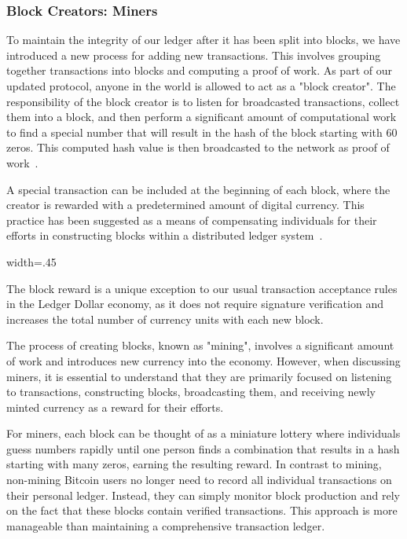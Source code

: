 \subsubsection{Block Creators: Miners}
To maintain the integrity of our ledger after it has been split into blocks, we have introduced a new process for adding
new transactions. This involves grouping together transactions into blocks and computing a proof of work. As part of our
updated protocol, anyone in the world is allowed to act as a "block creator". The responsibility of the block creator is
to listen for broadcasted transactions, collect them into a block, and then perform a significant amount of computational
work to find a special number that will result in the hash of the block starting with 60 zeros. This computed hash value
is then broadcasted to the network as proof of work~\cite{wood2014ethereum}.

A special transaction can be included at the beginning of each block, where the creator is rewarded with a predetermined
amount of digital currency. This practice has been suggested as a means of compensating individuals for their efforts in
constructing blocks within a distributed ledger system~\cite{ding2020incentive}.

{width=.45\textwidth}%

The block reward is a unique exception to our usual transaction acceptance rules in the Ledger Dollar economy, as it does
not require signature verification and increases the total number of currency units with each new block.

The process of creating blocks, known as
"mining", involves a significant amount of work and introduces new currency into the economy. However, when discussing
miners, it is essential to understand that they are primarily focused on listening to transactions, constructing blocks,
broadcasting them, and receiving newly minted currency as a reward for their efforts.

For miners, each block can be thought of as a miniature lottery where individuals guess numbers rapidly until one person
finds a combination that results in a hash starting with many zeros, earning the resulting reward. In contrast to mining,
non-mining Bitcoin users no longer need to record all individual transactions on their personal ledger. Instead, they can
simply monitor block production and rely on the fact that these blocks contain verified transactions. This approach is more
manageable than maintaining a comprehensive transaction ledger.

